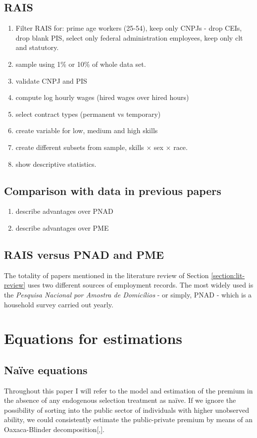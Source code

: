 \documentclass{article}
\begin{document}
\subsection{RAIS}
\begin{enumerate}
    \item Filter RAIS for: prime age workers (25-54), keep only CNPJs - drop CEIs, drop blank PIS, select only federal administration employees, keep only clt and statutory.
    \item sample using 1\% or 10\% of whole data set.  
    \item validate CNPJ and PIS
    \item compute log hourly wages (hired wages over hired hours)
    \item select contract types (permanent vs temporary)
    \item create variable for low, medium and high skills
    \item create different subsets from sample, skills $\times$ sex $\times$ race.
    \item show descriptive statistics.
\end{enumerate}

\subsection{Comparison with data in previous papers}
\begin{enumerate}
    \item describe advantages over PNAD
    \item describe advantages over PME
\end{enumerate}

\subsection{RAIS versus PNAD and PME}
The totality of papers mentioned in the literature review of Section \ref{section:lit-review} uses two different sources of employment records. The most widely used is the \emph{Pesquisa Nacional por Amostra de Domicílios} - or simply, PNAD - which is a household survey carried out yearly.  

\section{Equations for estimations}
\subsection{Naïve equations}
Throughout this paper I will refer to the model and estimation of the premium in the absence of any endogenous selection treatment as naïve. If we ignore the possibility of sorting into the public sector of individuals with higher unobserved ability, we could consistently estimate the public-private premium by means of an Oaxaca-Blinder decomposition[\cite{oaxaca_male-female_1973},\cite{blinder_wage_1973}]. \\
\end{document}
